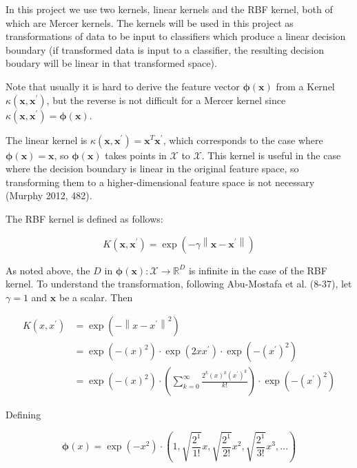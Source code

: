\documentclass[letterpaper, 11pt]{article}
\newcommand{\norm}[1]{\left\lVert #1 \right\rVert}
\newcommand{\vect}[1]{\boldsymbol{#1}}
\begin{document}
In this project we use two kernels, linear kernels and the RBF kernel, both of which are Mercer kernels. The kernels will be used in this project as transformations of data to be input to classifiers which produce a linear decision boundary (if transformed data is input to a classifier, the resulting decision boudary will be linear in that transformed space).

Note that usually it is hard to derive the feature vector $\vect{\phi}(\vect{x})$ from a Kernel $\kappa(\vect{x}, \vect{x}^\prime)$, but the reverse is not difficult for a Mercer kernel since $\kappa(\vect{x}, \vect{x}^\prime) = \vect{\phi}(\vect{x})$.

The linear kernel is $\kappa(\vect{x}, \vect{x}^\prime) = \vect{x}^T\vect{x}^\prime$, which corresponds to the case where $\vect{\phi}(\vect{x}) = \vect{x}$, so $\vect{\phi}(\vect{x})$ takes points in $\mathcal{X}$ to $\mathcal{X}$. This kernel is useful in the case where the decision boundary is linear in the original feature space, so transforming them to a higher-dimensional feature space is not necessary (Murphy 2012, 482).

The RBF kernel is defined as follows:

\begin{equation*}
  K(\vect{x}, \vect{x}^\prime) = \exp\left(-\gamma \norm{\vect{x} - \vect{x}^\prime}\right)
\end{equation*}

As noted above, the $D$ in $\vect{\phi}(\vect{x}): \mathcal{X} \rightarrow \mathbb{R}^D$ is infinite in the case of the RBF kernel. To understand the transformation, following Abu-Mostafa et al. (8-37), let $\gamma = 1$ and $\vect{x}$ be a scalar. Then

\begin{align*}
  K(x, x^\prime) & = \exp\left(-\norm{x - x^\prime}^2\right) \\
  & = \exp\left(-(x)^2\right) \cdot \exp\left(2xx^\prime\right) \cdot \exp(-\left(x^\prime\right)^2) \\
  & = \exp\left(-(x)^2\right) \cdot \left(\sum_{k=0}^{\infty} \frac{2^k(x)^k\left(x^\prime\right)^k}{k!}\right) \cdot \exp\left(-\left(x^\prime\right)^2\right)
\end{align*}

Defining

\begin{equation*}
  \vect{\phi}(x) = \exp(-x^2) \cdot \left(1, \sqrt{\frac{2^1}{1!}}x, \sqrt{\frac{2^1}{2!}}x^2, \sqrt{\frac{2^1}{3!}}x^3, \ldots \right)
\end{equation*}
\end{document}
